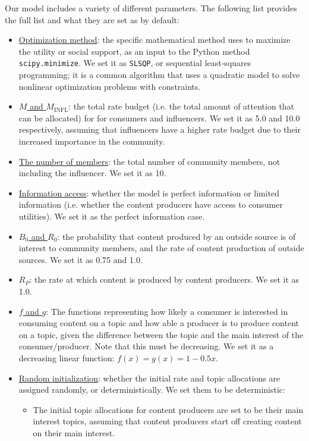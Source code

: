 \documentclass[11pt, letterpaper]{article}
\begin{document}
Our model includes a variety of different parameters. The following list provides the full list and what they are set as by default:
\begin{itemize}
    \item \underline{Optimization method}: the specific mathematical method uses to maximize the utility or social support, as an input to the Python method \texttt{scipy.minimize}. We set it as \texttt{SLSQP}, or sequential least-squares programming; it is a common algorithm that uses a quadratic model to solve nonlinear optimization problems with constraints.
    \item \underline{\(M\) and \(M_\text{INFL}\)}: the total rate budget (i.e. the total amount of attention that can be allocated) for for consumers and influencers. We set it as 5.0 and 10.0 respectively, assuming that influencers have a higher rate budget due to their increased importance in the community.
    \item \underline{The number of members}: the total number of community members, not including the influencer. We set it as 10.
    \item \underline{Information access}: whether the model is perfect information or limited information (i.e. whether the content producers have access to consumer utilities). We set it as the perfect information case. 
    \item \underline{\(B_0\) and \(R_0\)}: the probability that content produced by an outside source is of interest to community members, and the rate of content production of outside sources. We set it as 0.75 and 1.0.
    \item \underline{\(R_P\)}: the rate at which content is produced by content producers. We set it as 1.0.
    \item \underline{\(f\) and \(g\)}: The functions representing how likely a consumer is interested in consuming content on a topic and how able a producer is to produce content on a topic, given the difference between the topic and the main interest of the consumer/producer. Note that this must be decreasing. We set it as a decreasing linear function: \(f(x) = g(x) = 1 - 0.5x\).
    \item \underline{Random initialization}: whether the initial rate and topic allocations are assigned randomly, or deterministically. We set them to be deterministic:
    \begin{itemize}
        \item The initial topic allocations for content producers are set to be their main interest topics, assuming that content producers start off creating content on their main interest.

\end{itemize}
\end{itemize}
\end{document}
